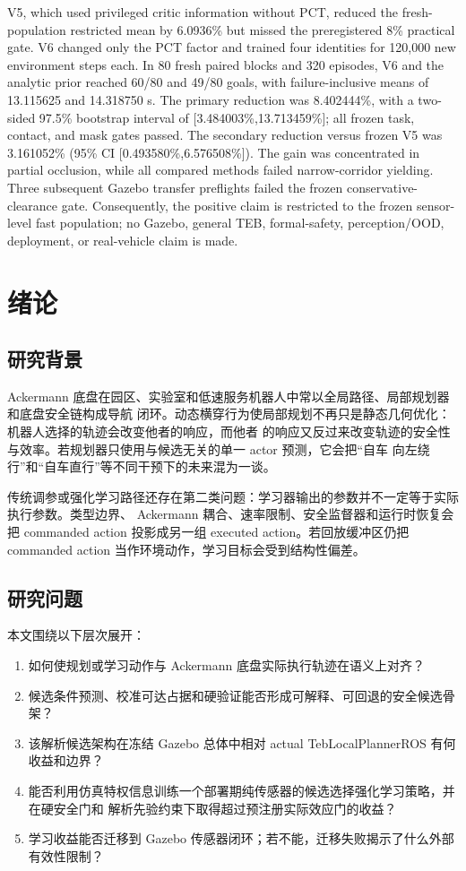 \documentclass[12pt,a4paper,oneside]{report}
\begin{document}
V5, which used privileged critic information without PCT, reduced the fresh-population restricted
mean by 6.0936\% but missed the preregistered 8\% practical gate. V6 changed only the PCT factor and
trained four identities for 120,000 new environment steps each. In 80 fresh paired blocks and 320
episodes, V6 and the analytic prior reached 60/80 and 49/80 goals, with failure-inclusive means of
13.115625 and 14.318750 s. The primary reduction was 8.402444\%, with a two-sided 97.5\% bootstrap
interval of [3.484003\%,13.713459\%]; all frozen task, contact, and mask gates passed. The
secondary reduction versus frozen V5 was 3.161052\% (95\% CI [0.493580\%,6.576508\%]). The gain was
concentrated in partial occlusion, while all compared methods failed narrow-corridor yielding.
Three subsequent Gazebo transfer preflights failed the frozen conservative-clearance gate.
Consequently, the positive claim is restricted to the frozen sensor-level fast population; no
Gazebo, general TEB, formal-safety, perception/OOD, deployment, or real-vehicle claim is made.

\tableofcontents
\listoftables
\listoffigures
\clearpage
{}

\chapter{绪论}
\section{研究背景}
Ackermann 底盘在园区、实验室和低速服务机器人中常以全局路径、局部规划器和底盘安全链构成导航
闭环。动态横穿行为使局部规划不再只是静态几何优化：机器人选择的轨迹会改变他者的响应，而他者
的响应又反过来改变轨迹的安全性与效率。若规划器只使用与候选无关的单一 actor 预测，它会把“自车
向左绕行”和“自车直行”等不同干预下的未来混为一谈。

传统调参或强化学习路径还存在第二类问题：学习器输出的参数并不一定等于实际执行参数。类型边界、
Ackermann 耦合、速率限制、安全监督器和运行时恢复会把 commanded action 投影成另一组 executed
action。若回放缓冲区仍把 commanded action 当作环境动作，学习目标会受到结构性偏差。

\section{研究问题}
本文围绕以下层次展开：
\begin{enumerate}
  \item 如何使规划或学习动作与 Ackermann 底盘实际执行轨迹在语义上对齐？
  \item 候选条件预测、校准可达占据和硬验证能否形成可解释、可回退的安全候选骨架？
  \item 该解析候选架构在冻结 Gazebo 总体中相对 actual TebLocalPlannerROS 有何收益和边界？
  \item 能否利用仿真特权信息训练一个部署期纯传感器的候选选择强化学习策略，并在硬安全门和
  解析先验约束下取得超过预注册实际效应门的收益？
  \item 学习收益能否迁移到 Gazebo 传感器闭环；若不能，迁移失败揭示了什么外部有效性限制？
\end{enumerate}
\end{document}
